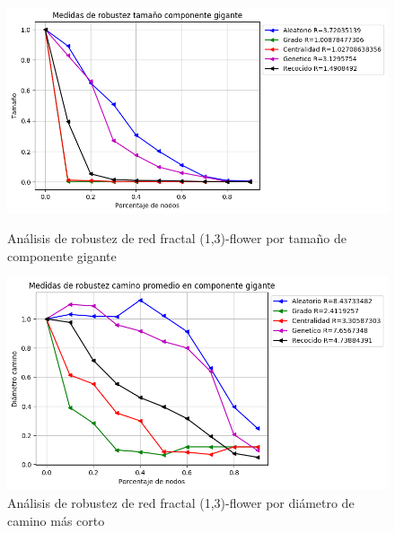 \begin{figure}[!htb]
    \begin{minipage}{0.48\textwidth}
        \centering
        \includegraphics[scale=0.4]{CapituloAAnexos/imagenesAnexoC/Robustez/grafica_GC20180501_151350floweru1v3}
        \caption{Análisis de robustez de red fractal (1,3)-flower por tamaño de componente gigante}
    \end{minipage}\hfill
   \begin{minipage}{0.48\textwidth}
         \centering
       \includegraphics[scale=0.4]{CapituloAAnexos/imagenesAnexoC/Robustez/grafica_APL20180501_151350floweru1v3}
        \caption{Análisis de robustez de red fractal (1,3)-flower por diámetro de camino más corto}
    \end{minipage}
\end{figure}


